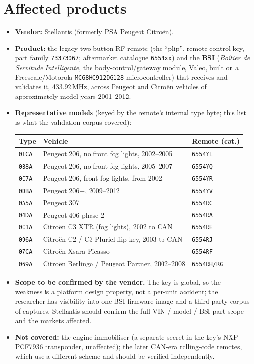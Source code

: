 \documentclass[11pt,a4paper]{article}
\newcommand{\hex}[1]{\texttt{#1}}
\begin{document}
\section{Affected products}
\begin{itemize}
\item \textbf{Vendor:} Stellantis (formerly PSA Peugeot Citro\"en).
\item \textbf{Product:} the legacy two-button RF remote (the ``plip'', remote-control key, part family \hex{73373067}; aftermarket catalogue \hex{6554xx}) and the \textbf{BSI} (\emph{Bo\^itier de Servitude Intelligente}, the body-control/gateway module, Valeo, built on a Freescale/Motorola \hex{MC68HC912DG128} microcontroller) that receives and validates it, 433.92\,MHz, across Peugeot and Citro\"en vehicles of approximately model years 2001--2012.
\item \textbf{Representative models} (keyed by the remote's internal type byte; this list is what the validation corpus covered):
\begin{table}[h]
\centering\small
\begin{tabular}{lll}
\toprule
Type & Vehicle & Remote (cat.) \\
\midrule
\hex{01CA} & Peugeot 206, no front fog lights, 2002--2005 & \hex{6554YL} \\
\hex{0B8A} & Peugeot 206, no front fog lights, 2005--2007 & \hex{6554YQ} \\
\hex{0C7A} & Peugeot 206, front fog lights, from 2002 & \hex{6554YR} \\
\hex{0DBA} & Peugeot 206+, 2009--2012 & \hex{6554YV} \\
\hex{0A5A} & Peugeot 307 & \hex{6554RC} \\
\hex{04DA} & Peugeot 406 phase 2 & \hex{6554RA} \\
\hex{0C1A} & Citro\"en C3 XTR (fog lights), 2002 to CAN & \hex{6554RE} \\
\hex{096A} & Citro\"en C2 / C3 Pluriel flip key, 2003 to CAN & \hex{6554RJ} \\
\hex{07CA} & Citro\"en Xsara Picasso & \hex{6554RF} \\
\hex{069A} & Citro\"en Berlingo / Peugeot Partner, 2002--2008 & \hex{6554RH/RG} \\
\bottomrule
\end{tabular}
\end{table}
\item \textbf{Scope to be confirmed by the vendor.} The key is global, so the weakness is a platform design property, not a per-unit accident; the researcher has visibility into one BSI firmware image and a third-party corpus of captures. Stellantis should confirm the full VIN / model / BSI-part scope and the markets affected.
\item \textbf{Not covered:} the engine immobiliser (a separate secret in the key's NXP PCF7936 transponder, unaffected); the later CAN-era rolling-code remotes, which use a different scheme and should be verified independently.
\end{itemize}
\end{document}
